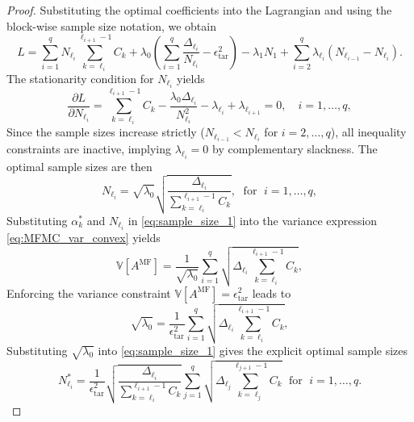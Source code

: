 \begin{proof}
Substituting the optimal coefficients into the Lagrangian and using the block-wise sample size notation, we obtain
%
\begin{equation*}
L= \sum_{i=1}^q N_{\ell_i}\sum_{k=\ell_i}^{\ell_{i+1}-1} C_k +\lambda_0 \left( \sum_{i=1}^{q} \frac{\Delta_{\ell_i}}{N_{\ell_i}}- \epsilon_{\text{tar}}^2\right)-\lambda_1 N_1+\sum_{i=2}^q\lambda_{\ell_{i}}(N_{\ell_{i-1}} - N_{\ell_{i}}).
\end{equation*}
%
The stationarity condition for $N_{\ell_i}$ yields
%
\[
\frac{\partial L}{\partial N_{\ell_i}} =\sum_{k=\ell_i}^{\ell_{i+1}-1} C_{k} -  \frac{\lambda_0\Delta_{\ell_i}}{N_{\ell_i}^2}-\lambda_{\ell_{i}}+\lambda_{\ell_{i+1}}=0,\quad i = 1, \ldots,q,
\]
%
Since the sample sizes increase strictly ($N_{\ell_{i-1}} < N_{\ell_i}$ for $i = 2, \ldots, q$), all inequality constraints are inactive, implying $\lambda_{\ell_i} = 0$ by complementary slackness. The optimal sample sizes are then
%
\begin{equation}\label{eq:sample_size_1}
    N_{\ell_i} = \sqrt{\lambda_0} \sqrt{\frac{\Delta_{\ell_i}}{\sum_{k=\ell_i}^{\ell_{i+1}-1} C_{k}}}, \;\text{ for }\; i=1,\ldots,q,
\end{equation}
%
Substituting $\alpha_k^*$ and $N_{\ell_i}$ in \eqref{eq:sample_size_1} into the variance expression \eqref{eq:MFMC_var_convex} yields
%
\begin{equation*} \label{eq:MFMC_variance2}
    \mathbb{V}\left[A^{\text{MF}}\right] = \frac{1}{\sqrt{\lambda_0}}\sum_{i=1}^q\sqrt{\Delta_{\ell_i}\sum_{k=\ell_i}^{\ell_{i+1}-1} C_k},
\end{equation*}
%
Enforcing the variance constraint $\mathbb{V}[A^{\text{MF}}] = \epsilon_{\text{tar}}^2$ leads to
%
\[
\sqrt{\lambda_0}=\frac{1}{\epsilon_{\text{tar}}^2} \sum_{i=1}^{q} \sqrt{\Delta_{\ell_i}\sum_{k=\ell_i}^{\ell_{i+1}-1} C_{k}},
\]
%
Substituting $\sqrt{\lambda_0}$ into \eqref{eq:sample_size_1} gives the explicit optimal sample sizes
%
\[
N_{\ell_i}^* = \frac{1}{\epsilon_{\text{tar}}^2}\sqrt{\frac{\Delta_{\ell_i}}{\sum_{k=\ell_i}^{\ell_{i+1}-1} C_{k}}}  \sum_{j=1}^{q} \sqrt{\Delta_{\ell_j}\sum_{k=\ell_j}^{\ell_{j+1}-1} C_{k}} \;\text{ for }\; i=1,\ldots,q.
\]
%


\end{proof}
